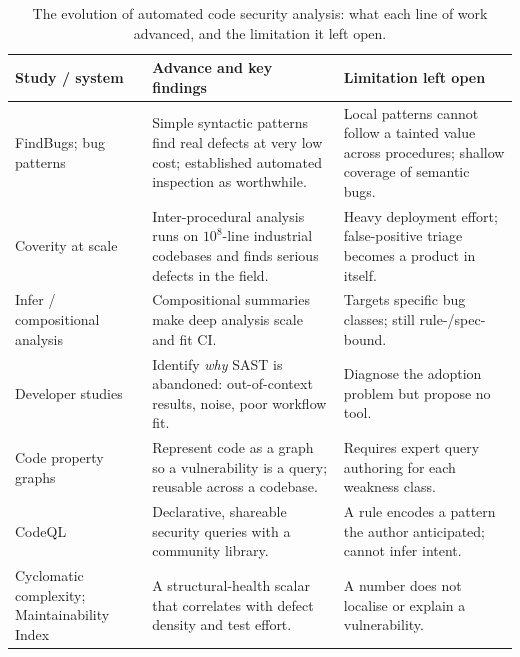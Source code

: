 \begin{table}[!tbp]
  \centering
  \caption{The evolution of automated code security analysis: what each
           line of work advanced, and the limitation it left open.}
  \label{tab:litreview}
  \renewcommand{\arraystretch}{1.25}
  \small
  \begin{tabularx}{\textwidth}{@{}p{} X X@{}}
    \toprule
    \textbf{Study / system} & \textbf{Advance and key findings} &
    \textbf{Limitation left open} \\
    \midrule

    FindBugs; bug patterns \cite{ayewah2008} &
      Simple syntactic patterns find real defects at very low cost;
      established automated inspection as worthwhile. &
      Local patterns cannot follow a tainted value across
      procedures; shallow coverage of semantic bugs. \\

    Coverity at scale \cite{bessey2010} &
      Inter-procedural analysis runs on $10^8$-line industrial
      codebases and finds serious defects in the field. &
      Heavy deployment effort; false-positive triage becomes a
      product in itself. \\

    Infer / compositional analysis \cite{distefano2019} &
      Compositional summaries make deep analysis scale and fit CI. &
      Targets specific bug classes; still rule-/spec-bound. \\

    Developer studies \cite{johnson2013,nachtigall2022} &
      Identify \emph{why} SAST is abandoned: out-of-context results,
      noise, poor workflow fit. &
      Diagnose the adoption problem but propose no tool. \\

    Code property graphs \cite{yamaguchi2014} &
      Represent code as a graph so a vulnerability is a query;
      reusable across a codebase. &
      Requires expert query authoring for each weakness class. \\

    CodeQL \cite{avgustinov2016} &
      Declarative, shareable security queries with a community
      library. &
      A rule encodes a pattern the author anticipated; cannot infer
      intent. \\

    Cyclomatic complexity;
    Maintainability Index \cite{mccabe1976,coleman1994} &
      A structural-health scalar that correlates with defect density
      and test effort. &
      A number does not localise or explain a vulnerability. \\


\end{tabularx}
\end{table}
